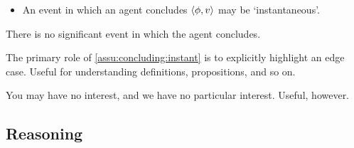 \begin{note}
  \begin{assumption}
    \label{assu:concluding:instant}

    \begin{itemize}
    \item
      An event in which an agent concludes \(\langle \phi, v \rangle\) may be `instantaneous'.
    \end{itemize}
    \vspace{-\baselineskip}
  \end{assumption}

  There is no significant event in which the agent concludes.

  The primary role of \autoref{assu:concluding:instant} is to explicitly highlight an edge case.
  Useful for understanding definitions, propositions, and so on.

  You may have no interest, and we have no particular interest.
  Useful, however.
\end{note}

\subsection{Reasoning}
\label{sec:reasoning}

